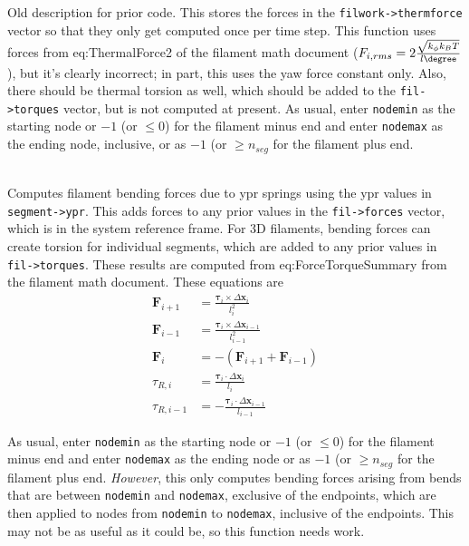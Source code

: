 \documentclass {scrbook}
\newcommand {\ttt} {\texttt}
\begin{document}
\begin{description}
Old description for prior code. This stores the forces in the \ttt{filwork->thermforce} vector so that they only get computed once per time step. This function uses forces from eq:ThermalForce2 of the filament math document ($F_{i,rms} = 2 \frac{ \sqrt{k_\phi k_B T}}{l\degree}$), but it's clearly incorrect; in part, this uses the yaw force constant only. Also, there should be thermal torsion as well, which should be added to the \ttt{fil->torques} vector, but is not computed at present. As usual, enter \ttt{nodemin} as the starting node or $-1$ (or $\leq 0$) for the filament minus end and enter \ttt{nodemax} as the ending node, inclusive, or as $-1$ (or $\geq n_{seg}$ for the filament plus end.

\item[\ttt{void filAddBendForces(filamentptr fil,int nodemin,int nodemax)}]
\hfill \\
Computes filament bending forces due to ypr springs using the ypr values in \ttt{segment->ypr}. This adds forces to any prior values in the \ttt{fil->forces} vector, which is in the system reference frame. For 3D filaments, bending forces can create torsion for individual segments, which are added to any prior values in \ttt{fil->torques}. These results are computed from eq:ForceTorqueSummary from the filament math document. These equations are
\begin{align*}
\bm{F}_{i+1} &= \frac{\bm{\tau}_i \times \Delta \bm{x}_i}{l_i^2} \\
\bm{F}_{i-1} &= \frac{\bm{\tau}_i \times \Delta \bm{x}_{i-1}}{l_{i-1}^2} \\
\bm{F}_i &= - (\bm{F}_{i+1} + \bm{F}_{i-1}) \\
\tau_{R,i} &= \frac{\bm{\tau}_i \cdot \Delta \bm{x}_i }{l_i} \\
\tau_{R,i-1} &= - \frac{\bm{\tau}_i \cdot \Delta \bm{x}_{i-1}}{l_{i-1}}
\end{align*}

As usual, enter \ttt{nodemin} as the starting node or $-1$ (or $\leq 0$) for the filament minus end and enter \ttt{nodemax} as the ending node or as $-1$ (or $\geq n_{seg}$ for the filament plus end. \textit{However}, this only computes bending forces arising from bends that are between \ttt{nodemin} and \ttt{nodemax}, exclusive of the endpoints, which are then applied to nodes from \ttt{nodemin} to \ttt{nodemax}, inclusive of the endpoints. This may not be as useful as it could be, so this function needs work.


\end{description}
\end{document}
